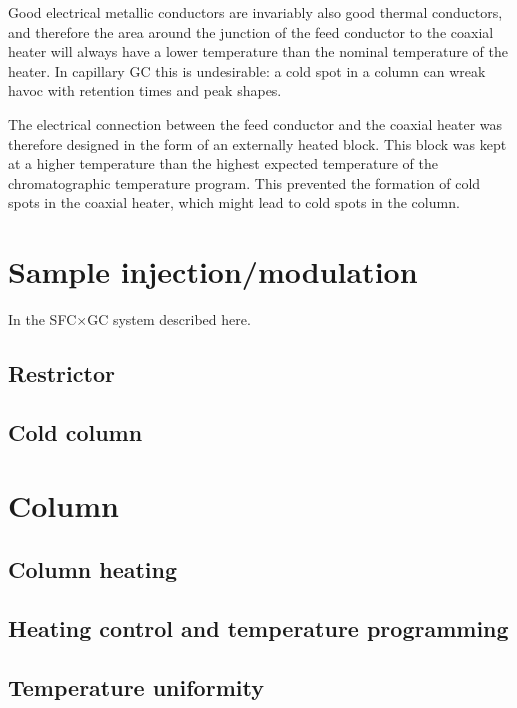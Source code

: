 Good electrical metallic conductors are invariably also good thermal
conductors, and therefore the area around the junction of the feed conductor to
the coaxial heater will always have a lower temperature than the nominal
temperature of the heater. In capillary GC this is undesirable: a cold spot in a
column can wreak havoc with retention times and peak shapes. 

The electrical connection between the feed conductor and the coaxial heater was
therefore designed in the form of an externally heated block. This block was
kept at a higher temperature than the highest expected temperature of the
chromatographic temperature program. This prevented the formation of cold spots
in the coaxial heater, which might lead to cold spots in the column.
 

\section{Sample injection/modulation}

In the SFC$\times$GC system described here. 


\subsection{Restrictor}


\subsection{Cold column}

\section{Column}

\subsection{Column heating}

\subsection{Heating control and temperature programming}

\subsection{Temperature uniformity}
\label{sec:Uniformity}

